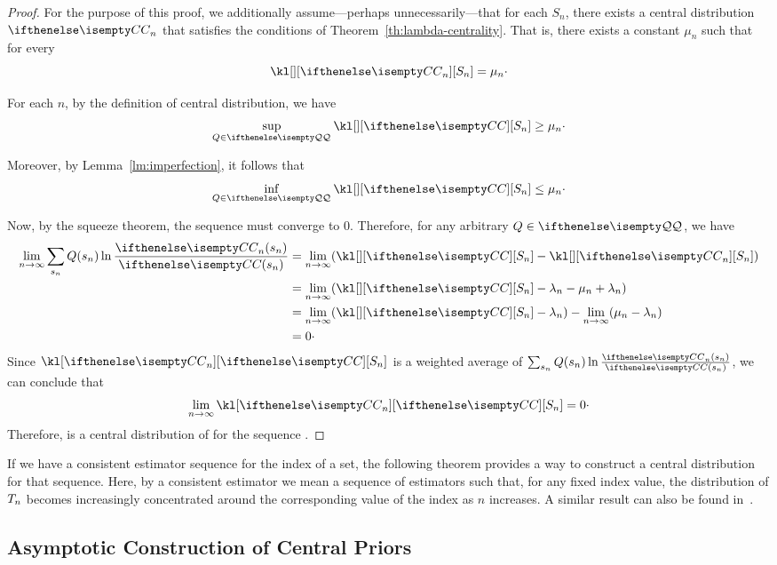 \begin{proof}
    For the purpose of this proof, we additionally assume—perhaps unnecessarily—that for each \(S_n\), there exists
    a central distribution $\cDist_n$ that satisfies the conditions of Theorem~\ref{th:lambda-centrality}.
    That is, there exists a constant \(\mu_n\) such that for every 
    \[
        \kl[][\cDist_n][S_n] = \mu_n \cdot
    \]

    For each \(n\), by the definition of central distribution, we have
    \[
        \sup_{\inSet{Q}} \kl[][\cDist][S_n] \geq \mu_n \cdot
    \]

    Moreover, by Lemma~\ref{lm:imperfection}, it follows that
    \[
        \inf_{\inSet{Q}} \kl[][\cDist][S_n] \leq \mu_n \cdot
    \]

    Now, by the squeeze theorem, the sequence  must converge to $0$.
    Therefore, for any arbitrary \(Q \in \setQ\), we have
    \begin{align*}
        \toInf \sum_{s_n} Q(s_n) \ln \frac{\cDist_n(s_n)}{\cDist(s_n)} &=
        \toInf (\kl[][\cDist][S_n] - \kl[][\cDist_n][S_n]) \\
        &= \toInf (\kl[][\cDist][S_n] - \lambda_n -\mu_n + \lambda_n) \\
        &= \toInf(\kl[][\cDist][S_n] - \lambda_n) - \toInf(\mu_n - \lambda_n) \\
        &= 0 \cdot
    \end{align*}
    Since $\kl[\cDist_n][\cDist][S_n]$ is a weighted average of
    $\sum_{s_n} Q(s_n) \ln \frac{\cDist_n(s_n)}{\cDist(s_n)} $, we can conclude that
    \[
        \toInf \kl[\cDist_n][\cDist][S_n] = 0 \cdot
    \]
    Therefore, \cDist is a central distribution of \setQ for the sequence .
\end{proof}

If we have a consistent estimator sequence  for the index of a set,
the following theorem provides a way to construct a
central distribution for that sequence.
Here, by a consistent estimator we mean a sequence of estimators such that, for any fixed index value, the
distribution of $T_n$ becomes increasingly concentrated around the corresponding value of the
index as $n$ increases.
A similar result can also be found in~\cite{BERNARDO200517}.

\subsection{Asymptotic Construction of Central Priors}

